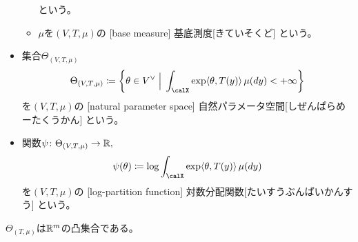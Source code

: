 \documentclass[report]{jlreq}
\begin{document}
\begin{definition}[指数型分布族]
\begin{itemize}
\begin{itemize}
                    という。
                \item $\mu$を$(V, T, \mu)$の
                    [base measure]
                    {基底測度}[きていそくど]
                    という。
            \end{itemize}
        \item 集合$\Theta_{(V, T, \mu)}$
            \begin{equation}
                \Theta_{(V, T, \mu)}
                    \coloneqq \mybrace{
                        \theta \in V^\vee
                        \;\Big|\;
                        \int_\calX \exp \langle \theta, T(y) \rangle \, \mu(dy) < +\infty
                    }
            \end{equation}
            を$(V, T, \mu)$の
            [natural parameter space]
            {自然パラメータ空間}[しぜんぱらめーたくうかん]
            という。
        \item 関数$\psi \colon \Theta_{(V, T, \mu)} \to \mathbb{R},$
            \begin{equation}
                \psi(\theta)
                    \coloneqq
                    \log \int_\calX \exp \langle \theta, T(y) \rangle \, \mu(dy)
            \end{equation}
            を$(V, T, \mu)$の
            [log-partition function]
            {対数分配関数}[たいすうぶんぱいかんすう]
            という。
    \end{itemize}
\end{definition}

\begin{proposition}[自然パラメータ空間は凸集合]
    $\Theta_{(T, \mu)}$は$\mathbb{R}^m$の凸集合である。
\end{proposition}
\end{document}
